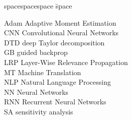 
\begin{tabbing}
spacespacespace \= space \kill

Adam \> Adaptive Moment Estimation \\
CNN \> Convolutional Neural Networks \\
DTD \> deep Taylor decomposition \\
GB  \> guided backprop \\
LRP \> Layer-Wise Relevance Propagation \\
MT \> Machine Translation \\
NLP \> Natural Language Processing \\
NN \> Neural Networks \\
RNN \> Recurrent Neural Networks \\
SA  \> sensitivity analysis \\


\end{tabbing}
